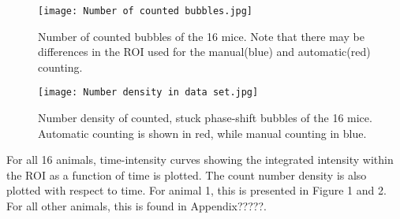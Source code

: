 \begin{figure}[h]
  \centering
  \label{Fig:Number of counted bubbles}
  \texttt{[image: Number of counted bubbles.jpg]}
  \caption{Number of counted bubbles of the 16 mice. Note that there may be differences in the ROI used for the manual(blue) and automatic(red) counting.}
\end{figure}

\begin{figure}[h]
  \centering
  \label{Fig:Number density of counted bubbles}
  \texttt{[image: Number density in data set.jpg]}
  \caption{Number density of counted, stuck phase-shift bubbles of the 16 mice. Automatic counting is shown in red, while manual counting in blue.}
\end{figure}

For all 16 animals, time-intensity curves showing the integrated intensity within the ROI as a function of time is plotted. The count number density is also plotted with respect to time. For animal 1, this is presented in Figure 1 and 2. For all other animals, this is found in Appendix?????.






